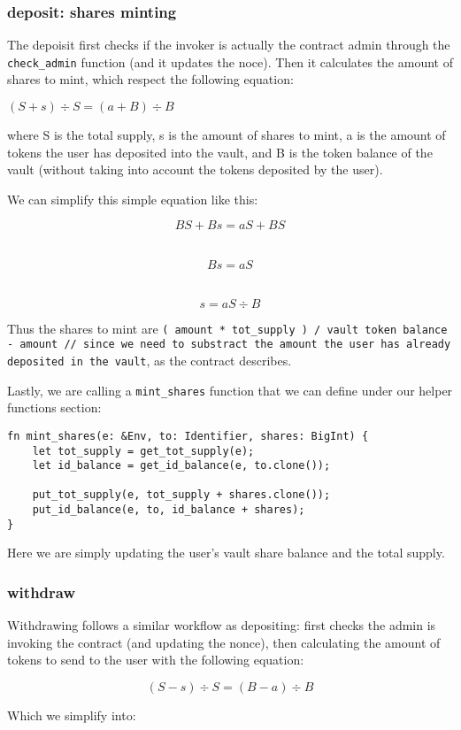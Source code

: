 \documentclass{article}
\newcommand{\inl}[1]{\lstinline{#1}}
\begin{document}
\subsubsection{deposit: shares minting}
The depoisit first checks if the invoker is actually the contract admin through the \inl{check_admin} function (and it updates the noce). Then it calculates the amount of shares to mint, which respect the following equation:

\( ( S + s ) \div S = ( a + B ) \div B \)

where S is the total supply, s is the amount of shares to mint, a is the amount of tokens the user has deposited into the vault, and B is the token balance of the vault (without taking into account the tokens deposited by the user).

We can simplify this simple equation like this:

\[ BS + Bs = aS + BS \]
\

\[ Bs = aS \]
\

\[ s = aS \div B \]

Thus the shares to mint are \inl{( amount * tot_supply ) / vault token balance - amount // since we need to substract the amount the user has already deposited in the vault}, as the contract describes.

Lastly, we are calling a \inl{mint_shares} function that we can define under our helper functions section:

\begin{lstlisting}
fn mint_shares(e: &Env, to: Identifier, shares: BigInt) {
    let tot_supply = get_tot_supply(e);
    let id_balance = get_id_balance(e, to.clone());

    put_tot_supply(e, tot_supply + shares.clone());
    put_id_balance(e, to, id_balance + shares);
}
\end{lstlisting}

Here we are simply updating the user's vault share balance and the total supply.

\subsubsection{withdraw}
Withdrawing follows a similar workflow as depositing: first checks the admin is invoking the contract (and updating the nonce), then calculating the amount of tokens to send to the user with the following equation:

\[ ( S - s ) \div S = ( B - a ) \div B \]

Which we simplify into:
\end{document}
